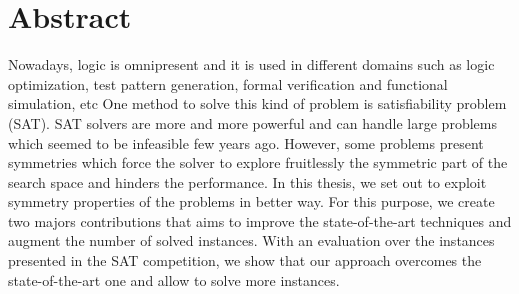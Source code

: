 \chapter*{Abstract}
Nowadays, logic is omnipresent and it is used in different domains such as logic optimization, test pattern generation, formal verification and functional simulation, etc
One method to solve this kind of problem is satisfiability problem (SAT).
SAT solvers are more and more powerful and can handle large problems which seemed to be infeasible 
few years ago. However, some problems present symmetries which force the solver to explore fruitlessly
the symmetric part of the search space and hinders the performance. 
In this thesis, we set out to exploit symmetry properties of the problems in better way.
For this purpose, we create two majors contributions that aims to improve the state-of-the-art techniques and augment the number of solved instances. With an evaluation over the instances presented in the SAT competition, we show that our approach overcomes the state-of-the-art one and allow to solve more instances. 